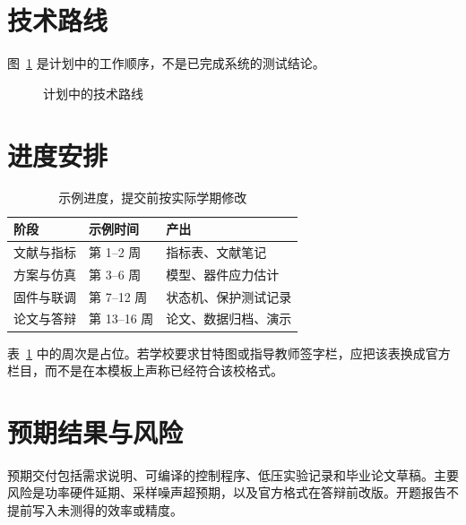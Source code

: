 \documentclass[12pt,fontset=fandol]{ctexart}
\begin{document}
\section{技术路线}
图~\ref{fig:route} 是计划中的工作顺序，不是已完成系统的测试结论。

\begin{figure}[htbp]
  \centering
  \caption{计划中的技术路线}\label{fig:route}
\end{figure}

\section{进度安排}
\begin{table}[htbp]
  \centering
  \caption{示例进度，提交前按实际学期修改}\label{tab:schedule}
  \begin{tabular}{lll}
    \toprule
    阶段 & 示例时间 & 产出 \\
    \midrule
    文献与指标 & 第 1--2 周 & 指标表、文献笔记 \\
    方案与仿真 & 第 3--6 周 & 模型、器件应力估计 \\
    固件与联调 & 第 7--12 周 & 状态机、保护测试记录 \\
    论文与答辩 & 第 13--16 周 & 论文、数据归档、演示 \\
    \bottomrule
  \end{tabular}
\end{table}

表~\ref{tab:schedule} 中的周次是占位。若学校要求甘特图或指导教师签字栏，应把该表换成官方栏目，而不是在本模板上声称已经符合该校格式。

\section{预期结果与风险}
预期交付包括需求说明、可编译的控制程序、低压实验记录和毕业论文草稿。主要风险是功率硬件延期、采样噪声超预期，以及官方格式在答辩前改版。开题报告不提前写入未测得的效率或精度。

\printbibliography[heading=bibintoc]
\end{document}

